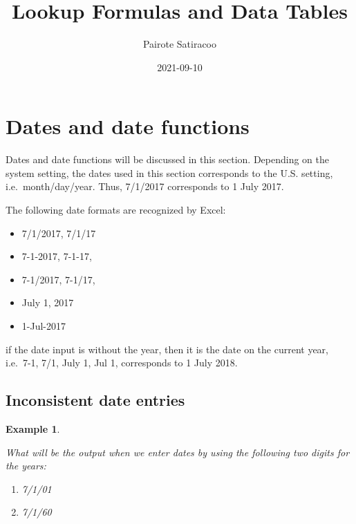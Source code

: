 \documentclass[
]{article}
\title{\textbf{Lookup Formulas and Data Tables}}
\author{Pairote Satiracoo}
\date{2021-09-10}
\theoremstyle{definition}
\theoremstyle{definition}
\newtheorem{example}{Example}[section]
\theoremstyle{definition}
\theoremstyle{definition}
\theoremstyle{remark}
\begin{document}
\maketitle

{
\setcounter{tocdepth}{2}
\tableofcontents
}
\hypertarget{dates-and-date-functions}{%
\section{Dates and date functions}\label{dates-and-date-functions}}

Dates and date functions will be discussed in this section. Depending on
the system setting, the dates used in this section corresponds to the
U.S. setting, i.e.~month/day/year. Thus, 7/1/2017 corresponds to 1 July
2017.

The following date formats are recognized by Excel:

\begin{itemize}
\item
  7/1/2017, 7/1/17
\item
  7-1-2017, 7-1-17,
\item
  7-1/2017, 7-1/17,
\item
  July 1, 2017
\item
  1-Jul-2017
\end{itemize}

if the date input is without the year, then it is the date on the
current year, i.e.~7-1, 7/1, July 1, Jul 1, corresponds to 1 July 2018.

\hypertarget{inconsistent-date-entries}{%
\subsection{Inconsistent date entries}\label{inconsistent-date-entries}}

\begin{example}
\protect\hypertarget{exm:unlabeled-div-1}{}\label{exm:unlabeled-div-1}

\emph{What will be the output when we enter dates by using the
following two digits for the years:}

\begin{enumerate}
\def\labelenumi{\arabic{enumi}.}
\item
  \emph{7/1/01}
\item
  \emph{7/1/60}
\end{enumerate}

\end{example}
\end{document}
